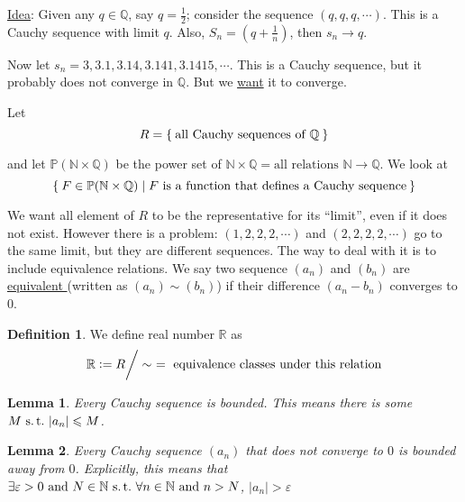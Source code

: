 \documentclass[12pt]{amsart}
\newcommand{\bbR}{\mathbb{R}}
\newcommand{\bbN}{\mathbb{N}}
\newcommand{\bbQ}{\mathbb{Q}}
\newcommand{\bbP}{\mathbb{P}}
\newcommand{\suchthat}{\operatorname{\thinspace s.t. \thinspace}}
\theoremstyle{plain}
\newtheorem*{lem}{Lemma}
\theoremstyle{remark}
\theoremstyle{definition}
\newtheorem*{define}{Definition}
\begin{document}
\ul{Idea}: Given any $q\in \bbQ$, say $q = \displaystyle\frac{1}{2}$; consider the sequence $(q,q,q,\cdots)$. This is a Cauchy sequence with limit $q$.
Also, $S_n = (q + \displaystyle \frac{1}{n})$, then $s_n \rightarrow q$.
\par
Now let $s_n = 3,3.1,3.14,3.141,3.1415,\cdots$. This is a Cauchy sequence, but it probably does not converge in $\bbQ$. But we \ul{want} it to converge.

\par
Let 
\begin{equation*}
	R = \Set{\mbox{all Cauchy sequences of } \bbQ}
\end{equation*}

\noindent and let $\bbP(\bbN \times \bbQ)$ be the power set of $\bbN \times \bbQ = \mbox{all relations } \bbN \rightarrow \bbQ$. We look at 
\begin{equation*}
	\Set{F \in \bbP(\bbN \times \bbQ) | F \mbox{ is a function that defines a Cauchy sequence}}
\end{equation*}

We want all element of $R$ to be the representative for its ``limit'', even if it does not exist. However there is a problem: $(1,2,2,2,\cdots)$ and $(2,2,2,2,\cdots)$ go to the same limit, but they are different sequences.
The way to deal with it is to include equivalence relations. We say two sequence $(a_n)$ and $(b_n)$ are \ul{equivalent } (written as $(a_n) \sim (b_n)$) if their difference $(a_n - b_n)$ converges to $0$. 

\begin{define}
	We define real number $\bbR$ as
	\begin{equation*}
		\bbR \vcentcolon = R \bigg/\sim\thinspace\thinspace = \mbox{ equivalence classes under this relation}
	\end{equation*}
\end{define}

\begin{lem}
	Every Cauchy sequence is bounded. This means there is some $M \suchthat |a_n| \leqslant M$.  
\end{lem}
\begin{lem} Every Cauchy sequence $(a_n)$ that does not converge to $0$ is bounded away from $0$. Explicitly, this means that $\exists \varepsilon > 0 \mbox{ and } N \in \bbN \suchthat \forall n \in \bbN \mbox{ and } n > N$, $|a_n| > \varepsilon$  
\end{lem}
\end{document}
